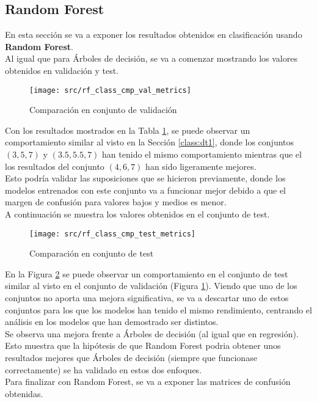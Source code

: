 \subsection{Random Forest}
En esta sección se va a exponer los resultados obtenidos en clasificación usando \textbf{Random Forest}.\\
Al igual que para Árboles de decisión, se va a comenzar mostrando los valores obtenidos en validación y test.
\begin{figure}[H]
	\centering
	\texttt{[image: src/rf\_class\_cmp\_val\_metrics]}
	\caption{Comparación en conjunto de validación}
	\label{fig:rf_class_cmp_val}
\end{figure}
Con los resultados mostrados en la Tabla \ref{fig:rf_class_cmp_val}, se puede observar un comportamiento similar al visto en la Sección \ref{class:dt1}, donde los conjuntos $(3,5,7)$ y $(3.5,5.5,7)$ han tenido el mismo comportamiento mientras que el los resultados del conjunto $(4,6,7)$ han sido ligeramente mejores. \\
Esto podría validar las suposiciones que se hicieron previamente, donde los modelos entrenados con este conjunto va a funcionar mejor debido a que el margen de confusión para valores bajos y medios es menor.\\
\clearpage
A continuación se muestra los valores obtenidos en el conjunto de test.
\begin{figure}[H]
	\centering
	\texttt{[image: src/rf\_class\_cmp\_test\_metrics]}
	\caption{Comparación en conjunto de test}
	\label{fig:rf_class_cmp_test}
\end{figure}
En la Figura \ref{fig:rf_class_cmp_test} se puede observar un comportamiento en el conjunto de test similar al visto en el conjunto de validación (Figura \ref{fig:rf_class_cmp_val}). Viendo que uno de los conjuntos no aporta una mejora significativa, se va a descartar uno de estos conjuntos para los que los modelos han tenido el mismo rendimiento, centrando el análisis en los modelos que han demostrado ser distintos.\\
\linebreak
Se observa una mejora frente a Árboles de decisión (al igual que en regresión). Esto muestra que la hipótesis de que Random Forest podria obtener unos resultados mejores que Árboles de decisión (siempre que funcionase correctamente) se ha validado en estos dos enfoques.\\
\linebreak
Para finalizar con Random Forest, se va a exponer las matrices de confusión obtenidas.
